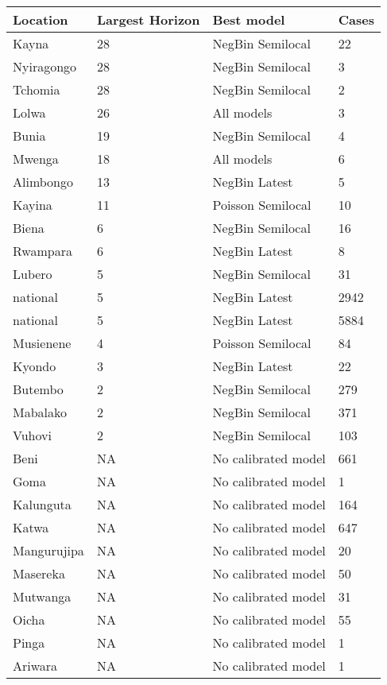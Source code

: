 \begin{table}[h!]
\centering
\begin{tabular}{|l|l|l|l|}
  \hline
Location & Largest Horizon & Best model & Cases \\ 
  \hline
Kayna & 28 & NegBin Semilocal & 22 \\ 
  Nyiragongo & 28 & NegBin Semilocal & 3 \\ 
  Tchomia & 28 & NegBin Semilocal & 2 \\ 
  Lolwa & 26 & All models & 3 \\ 
  Bunia & 19 & NegBin Semilocal & 4 \\ 
  Mwenga & 18 & All models & 6 \\ 
  Alimbongo & 13 & NegBin Latest & 5 \\ 
  Kayina & 11 & Poisson Semilocal & 10 \\ 
  Biena & 6 & NegBin Semilocal & 16 \\ 
  Rwampara & 6 & NegBin Latest & 8 \\ 
  Lubero & 5 & NegBin Semilocal & 31 \\ 
  national & 5 & NegBin Latest & 2942 \\ 
  national & 5 & NegBin Latest & 5884 \\ 
  Musienene & 4 & Poisson Semilocal & 84 \\ 
  Kyondo & 3 & NegBin Latest & 22 \\ 
  Butembo & 2 & NegBin Semilocal & 279 \\ 
  Mabalako & 2 & NegBin Semilocal & 371 \\ 
  Vuhovi & 2 & NegBin Semilocal & 103 \\ 
  Beni & NA & No calibrated model & 661 \\ 
  Goma & NA & No calibrated model & 1 \\ 
  Kalunguta & NA & No calibrated model & 164 \\ 
  Katwa & NA & No calibrated model & 647 \\ 
  Mangurujipa & NA & No calibrated model & 20 \\ 
  Masereka & NA & No calibrated model & 50 \\ 
  Mutwanga & NA & No calibrated model & 31 \\ 
  Oicha & NA & No calibrated model & 55 \\ 
  Pinga & NA & No calibrated model & 1 \\ 
  Ariwara & NA & No calibrated model & 1 \\ 

\end{tabular}
\end{table}
